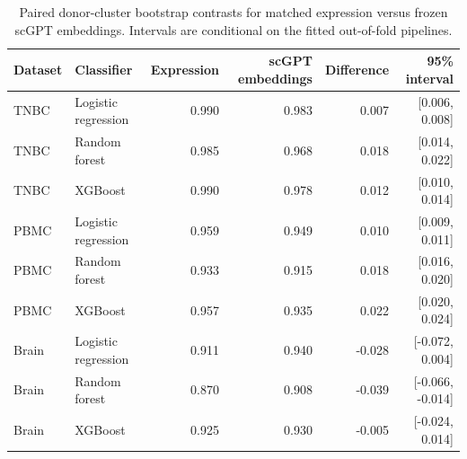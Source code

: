 \begin{table}[H]
\centering
\caption{Paired donor-cluster bootstrap contrasts for matched expression versus frozen scGPT embeddings. Intervals are conditional on the fitted out-of-fold pipelines.}
\label{tab:bootstrap}
\small
\begin{tabular}{llrrrr}
\toprule
Dataset & Classifier & Expression & scGPT embeddings & Difference & 95\% interval \\
\midrule
TNBC & Logistic regression & 0.990 & 0.983 & 0.007 & [0.006, 0.008] \\
TNBC & Random forest & 0.985 & 0.968 & 0.018 & [0.014, 0.022] \\
TNBC & XGBoost & 0.990 & 0.978 & 0.012 & [0.010, 0.014] \\
\addlinespace
PBMC & Logistic regression & 0.959 & 0.949 & 0.010 & [0.009, 0.011] \\
PBMC & Random forest & 0.933 & 0.915 & 0.018 & [0.016, 0.020] \\
PBMC & XGBoost & 0.957 & 0.935 & 0.022 & [0.020, 0.024] \\
\addlinespace
Brain & Logistic regression & 0.911 & 0.940 & -0.028 & [-0.072, 0.004] \\
Brain & Random forest & 0.870 & 0.908 & -0.039 & [-0.066, -0.014] \\
Brain & XGBoost & 0.925 & 0.930 & -0.005 & [-0.024, 0.014] \\
\bottomrule
\end{tabular}
\end{table}

